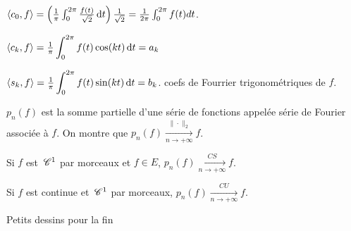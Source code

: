 \begin{exemple}
    $\langle c_0, f \rangle = \left( \frac 1 \pi \int_{0}^{2 \pi} \frac{f(t)}{\sqrt 2} \,\mathrm{d}t \right) \frac 1 {\sqrt 2} = \frac{1}{2 \pi} \int_{0}^{2 \pi} f(t) dt$.

    $\langle c_k, f \rangle = \frac 1 \pi \displaystyle \int_{0}^{2 \pi} f(t) \cos(kt) \,\mathrm{d}t = a_k$ 

    $\langle s_k, f \rangle = \frac 1 \pi \displaystyle \int_{0}^{2 \pi} f(t) \sin(kt) \,\mathrm{d}t = b_k$. coefs de Fourrier trigonométriques de $f$. 

    $p_n(f)$ est la somme partielle d'une série de fonctions appelée série de Fourier associée 
    à $f$. On montre que $p_n(f) \xrightarrow[n \to + \infty]{\| \cdot \|_2} f$. 

    Si $f$ est $\,\mathscr C^{1}$ par morceaux et $f \in E$, $p_n(f) \xrightarrow[n \to + \infty]{CS} f$.

    Si $f$ est continue et $\,\mathscr C^{1}$ par morceaux, $p_n(f) \xrightarrow[n \to + \infty]{CU} f$.

    Petits dessins pour la fin 
\end{exemple}

